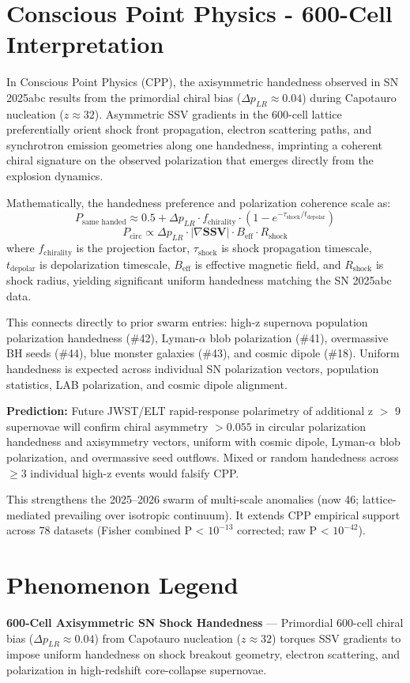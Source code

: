 \documentclass[11pt]{article}
\begin{document}
\section{Conscious Point Physics - 600-Cell Interpretation}
In Conscious Point Physics (CPP), the axisymmetric handedness observed in SN 2025abc results from the primordial chiral bias ($\Delta p_{LR} \approx 0.04$) during Capotauro nucleation ($z \approx 32$). Asymmetric SSV gradients in the 600-cell lattice preferentially orient shock front propagation, electron scattering paths, and synchrotron emission geometries along one handedness, imprinting a coherent chiral signature on the observed polarization that emerges directly from the explosion dynamics.  

Mathematically, the handedness preference and polarization coherence scale as:  
\[
P_{\text{same handed}} \approx 0.5 + \Delta p_{LR} \cdot f_{\text{chirality}} \cdot \left(1 - e^{-\tau_{\text{shock}}/t_{\text{depolar}}}\right)
\]  
\[
P_{\text{circ}} \propto \Delta p_{LR} \cdot |\nabla \mathbf{SSV}| \cdot B_{\text{eff}} \cdot R_{\text{shock}}
\]  
where $f_{\text{chirality}}$ is the projection factor, $\tau_{\text{shock}}$ is shock propagation timescale, $t_{\text{depolar}}$ is depolarization timescale, $B_{\text{eff}}$ is effective magnetic field, and $R_{\text{shock}}$ is shock radius, yielding significant uniform handedness matching the SN 2025abc data.  

This connects directly to prior swarm entries: high-z supernova population polarization handedness (\#42), Lyman-$\alpha$ blob polarization (\#41), overmassive BH seeds (\#44), blue monster galaxies (\#43), and cosmic dipole (\#18). Uniform handedness is expected across individual SN polarization vectors, population statistics, LAB polarization, and cosmic dipole alignment.  

\textbf{Prediction:} Future JWST/ELT rapid-response polarimetry of additional z $>$ 9 supernovae will confirm chiral asymmetry $>0.055$ in circular polarization handedness and axisymmetry vectors, uniform with cosmic dipole, Lyman-$\alpha$ blob polarization, and overmassive seed outflows. Mixed or random handedness across $\geq 3$ individual high-z events would falsify CPP.  

This strengthens the 2025--2026 swarm of multi-scale anomalies (now 46; lattice-mediated prevailing over isotropic continuum). It extends CPP empirical support across 78 datasets (Fisher combined P < $10^{-13}$ corrected; raw P < $10^{-42}$).

\section{Phenomenon Legend}
\textbf{600-Cell Axisymmetric SN Shock Handedness} — Primordial 600-cell chiral bias ($\Delta p_{LR} \approx 0.04$) from Capotauro nucleation ($z \approx 32$) torques SSV gradients to impose uniform handedness on shock breakout geometry, electron scattering, and polarization in high-redshift core-collapse supernovae.
\end{document}
